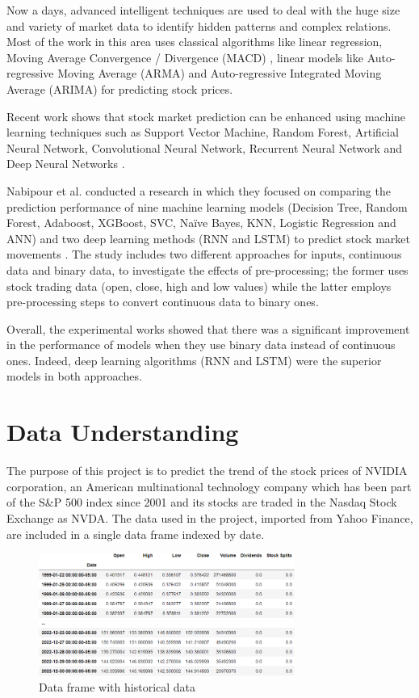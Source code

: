 \documentclass[conference,compsoc]{IEEEtran}
\begin{document}
Now a days, advanced intelligent techniques are used to deal with the huge size and variety of market data to identify hidden patterns and complex relations.
%
Most of the work in this area uses classical algorithms like linear regression, Moving Average Convergence / Divergence (MACD) \citep{linear}, linear models like Auto-regressive Moving Average (ARMA) and Auto-regressive Integrated Moving Average (ARIMA) \citep{arima} for predicting stock prices.

Recent work shows that stock market prediction can be enhanced using machine learning techniques such as Support Vector Machine, Random Forest, Artificial Neural Network, Convolutional Neural Network, Recurrent Neural Network and Deep Neural Networks \citep{neuron}.

Nabipour et al. conducted a research in which they focused on comparing the prediction performance of nine machine learning models (Decision Tree, Random Forest, Adaboost, XGBoost, SVC, Naïve Bayes, KNN, Logistic Regression and ANN) and two deep learning methods (RNN and LSTM) to predict stock market movements \citep{ieee}.
%
The study includes two different approaches for inputs, continuous data and binary data, to investigate the effects of pre-processing; the former uses stock trading data (open, close, high and low values) while the latter employs pre-processing steps to convert continuous data to binary ones.

Overall, the experimental works showed that there was a significant improvement in the performance of models when they use binary data instead of continuous ones. 
%
Indeed, deep learning algorithms (RNN and LSTM) were the superior models in both approaches.

\section{Data Understanding}
The purpose of this project is to predict the trend of the stock prices of NVIDIA corporation, an American multinational technology company which has been part of the S\&P 500 index since 2001 and its stocks are traded in the Nasdaq Stock Exchange as NVDA.
%
The data used in the project, imported from Yahoo Finance, are included in a single data frame indexed by date. 

\begin{figure}[h]
\centering
\includegraphics[width=3.3in]{images/dataframe.png}
\caption{Data frame with historical data}
\label{df}
\end{figure}
\end{document}
